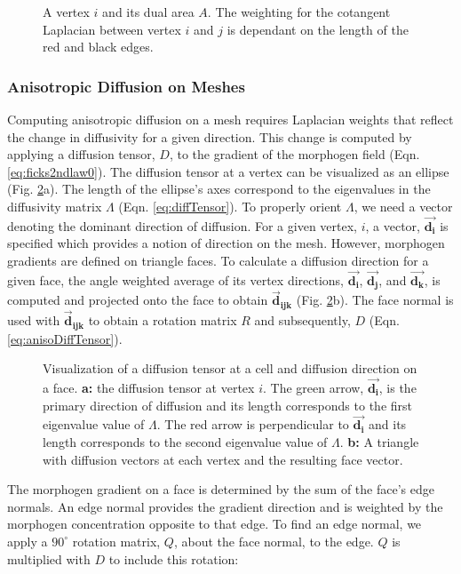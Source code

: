 \begin{figure}[H]
	\centering
	\caption[A vertex $i$ and its dual area $A$]{A vertex $i$ and its dual area $A$. The weighting for the cotangent Laplacian between vertex $i$ and $j$ is dependant on the length of the red and black edges.}
	\label{fig:dualMesh}
\end{figure}

\subsubsection*{Anisotropic Diffusion on Meshes}
Computing anisotropic diffusion on a mesh requires Laplacian weights that reflect the change in diffusivity for a given direction. This change is computed by applying a diffusion tensor, $D$, to the gradient of the morphogen field (Eqn. \ref{eq:ficks2ndlaw0}). The diffusion tensor at a vertex can be visualized as an ellipse (Fig. \ref{fig:anisoMesh}a). The length of the ellipse's axes correspond to the eigenvalues in the diffusivity matrix $\Lambda$ (Eqn. \ref{eq:diffTensor}). To properly orient $\Lambda$, we need a vector denoting the dominant direction of diffusion. For a given vertex, $i$, a vector, $\boldsymbol{\vec{d_i}}$ is specified which provides a notion of direction on the mesh. However, morphogen gradients are defined on triangle faces. To calculate a diffusion direction for a given face, the angle weighted average of its vertex directions, $\boldsymbol{\vec{d_i}}$, $\boldsymbol{\vec{d_j}}$, and $\boldsymbol{\vec{d_k}}$, is computed and projected onto the face to obtain $\boldsymbol{\vec{d}_{ijk}}$ (Fig. \ref{fig:anisoMesh}b). The face normal is used with $\boldsymbol{\vec{d}_{ijk}}$ to obtain a rotation matrix $R$ and subsequently, $D$ (Eqn. \ref{eq:anisoDiffTensor}). 
\begin{figure}[H]
	\centering
	\caption[Visualization of a diffusion tensor at a cell and diffusion direction on a face]{Visualization of a diffusion tensor at a cell and diffusion direction on a face. \textbf{a:} the diffusion tensor at vertex $i$. The green arrow, $\boldsymbol{\vec{d_i}}$, is the primary direction of diffusion and its length corresponds to the first eigenvalue value of $\Lambda$. The red arrow is perpendicular to $\boldsymbol{\vec{d_i}}$ and its length corresponds to the second eigenvalue value of $\Lambda$. \textbf{b:} A triangle with diffusion vectors at each vertex and the resulting face vector.}
	\label{fig:anisoMesh}
\end{figure}
The morphogen gradient on a face is determined by the sum of the face's edge normals. An edge normal provides the gradient direction and is weighted by the morphogen concentration opposite to that edge. To find an edge normal, we apply a $90^\circ$ rotation matrix, $Q$, about the face normal, to the edge. $Q$ is multiplied with $D$ to include this rotation:
